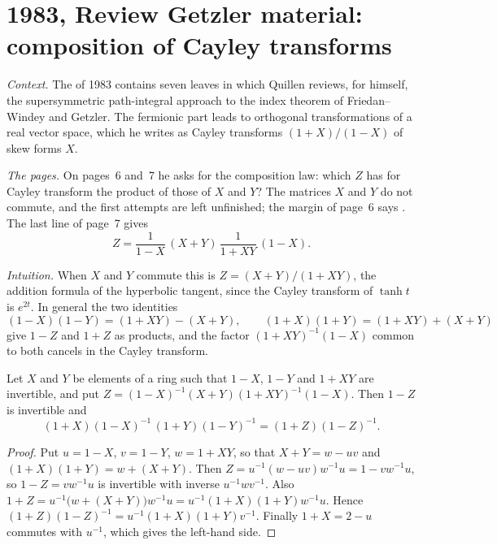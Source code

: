 \section[1983, Review Getzler material: composition of Cayley transforms]{1983, Review Getzler material: composition of Cayley transforms\protect{}}\label{sec:quillen-1983-getzler}

\emph{Context.} The  of 1983 contains seven leaves in which Quillen reviews, for himself, the supersymmetric path-integral approach to the index theorem of Friedan--Windey and Getzler. The fermionic part leads to orthogonal transformations of a real vector space, which he writes as Cayley transforms $(1 + X)/(1 - X)$ of skew forms $X$.

\emph{The pages.} On pages~6 and~7 he asks for the composition law: which $Z$ has for Cayley transform the product of those of $X$ and $Y$? The matrices $X$ and $Y$ do not commute, and the first attempts are left unfinished; the margin of page~6 says . The last line of page~7 gives
\[
  Z = \frac{1}{1 - X}\,(X + Y)\,\frac{1}{1 + XY}\,(1 - X).
\]

\emph{Intuition.} When $X$ and $Y$ commute this is $Z = (X + Y)/(1 + XY)$, the addition formula of the hyperbolic tangent, since the Cayley transform of $\tanh t$ is $e^{2t}$. In general the two identities
\[
  (1 - X)(1 - Y) = (1 + XY) - (X + Y), \qquad (1 + X)(1 + Y) = (1 + XY) + (X + Y)
\]
give $1 - Z$ and $1 + Z$ as products, and the factor $(1 + XY)^{-1}(1 - X)$ common to both cancels in the Cayley transform.

\begin{encadre}
\begin{theoreme}\label{thm:quillen-1983-getzler}
Let $X$ and $Y$ be elements of a ring such that $1 - X$, $1 - Y$ and $1 + XY$ are invertible, and put $Z = (1 - X)^{-1}(X + Y)(1 + XY)^{-1}(1 - X)$. Then $1 - Z$ is invertible and
\[
  (1 + X)(1 - X)^{-1}\,(1 + Y)(1 - Y)^{-1} = (1 + Z)(1 - Z)^{-1}.
\]
\end{theoreme}
\end{encadre}

\begin{proof}
Put $u = 1 - X$, $v = 1 - Y$, $w = 1 + XY$, so that $X + Y = w - uv$ and $(1 + X)(1 + Y) = w + (X + Y)$. Then $Z = u^{-1}(w - uv)w^{-1}u = 1 - vw^{-1}u$, so $1 - Z = vw^{-1}u$ is invertible with inverse $u^{-1}wv^{-1}$. Also $1 + Z = u^{-1}\bigl(w + (X + Y)\bigr)w^{-1}u = u^{-1}(1 + X)(1 + Y)w^{-1}u$. Hence $(1 + Z)(1 - Z)^{-1} = u^{-1}(1 + X)(1 + Y)v^{-1}$. Finally $1 + X = 2 - u$ commutes with $u^{-1}$, which gives the left-hand side.
\end{proof}

